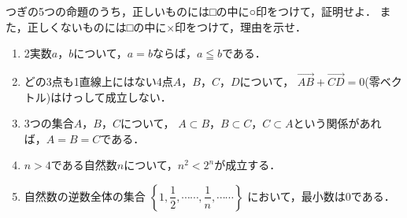 \documentclass[../../main.tex]{subfiles}
\begin{document}
つぎの5つの命題のうち，正しいものには□の中に○印をつけて，証明せよ．
また，正しくないものには□の中に×印をつけて，理由を示せ．
\begin{enumerate}
  \item [□　(1)]2実数$a$，$b$について，$a=b$ならば，$a \leqq b$である．
  \item [□　(2)]どの3点も1直線上にはない4点$A$，$B$，$C$，$D$について，
    $\overrightarrow{AB}+\overrightarrow{CD}=0$(零ベクトル)はけっして成立しない．
  \item [□　(3)]3つの集合$A$，$B$，$C$について，
    $A \subset B$，$B \subset C$，$C \subset A$という関係があれば，$A=B=C$である．
  \item [□　(4)]$n>4$である自然数$n$について，$n^2<2^n$が成立する．
  \item [□　(5)]自然数の逆数全体の集合
    $\displaystyle \left\{ 1,\dfrac{1}{2},\cdots\cdots,\dfrac{1}{n},\cdots\cdots \right\}$
    において，最小数は0である．
\end{enumerate}
\end{document}
